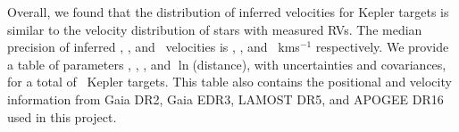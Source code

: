 Overall, we found that the distribution of inferred velocities for Kepler
targets is similar to the velocity distribution of stars with measured RVs.
The median precision of inferred \vx, \vy, and \vz\ velocities is
\vxprecision, \vyprecision, and \vzprecision\ kms$^{-1}$ respectively.
We provide a table of parameters \vx, \vy, \vz, and $\ln$(distance), with
uncertainties and covariances, for a total of \nstars\ Kepler targets.
This table also contains the positional and velocity information from Gaia
DR2, Gaia EDR3, LAMOST DR5, and APOGEE DR16 used in this project.
